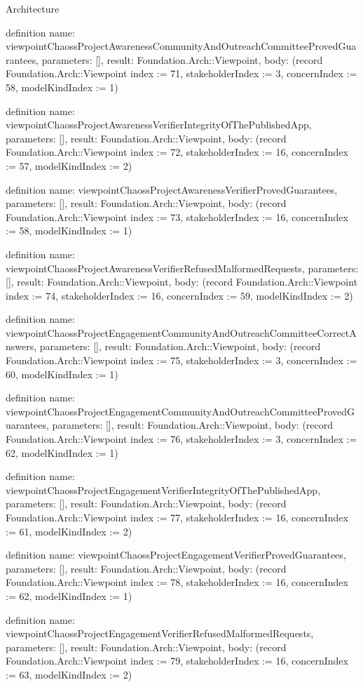\begin{lexlean}{Architecture}
\begin{semanticmodule}
definition{
  name: viewpointChaossProjectAwarenessCommunityAndOutreachCommitteeProvedGuarantees,
  parameters: [],
  result: Foundation.Arch::Viewpoint,
  body: (record Foundation.Arch::Viewpoint {index := 71, stakeholderIndex := 3, concernIndex := 58, modelKindIndex := 1})
}

definition{
  name: viewpointChaossProjectAwarenessVerifierIntegrityOfThePublishedApp,
  parameters: [],
  result: Foundation.Arch::Viewpoint,
  body: (record Foundation.Arch::Viewpoint {index := 72, stakeholderIndex := 16, concernIndex := 57, modelKindIndex := 2})
}

definition{
  name: viewpointChaossProjectAwarenessVerifierProvedGuarantees,
  parameters: [],
  result: Foundation.Arch::Viewpoint,
  body: (record Foundation.Arch::Viewpoint {index := 73, stakeholderIndex := 16, concernIndex := 58, modelKindIndex := 1})
}

definition{
  name: viewpointChaossProjectAwarenessVerifierRefusedMalformedRequests,
  parameters: [],
  result: Foundation.Arch::Viewpoint,
  body: (record Foundation.Arch::Viewpoint {index := 74, stakeholderIndex := 16, concernIndex := 59, modelKindIndex := 2})
}

definition{
  name: viewpointChaossProjectEngagementCommunityAndOutreachCommitteeCorrectAnswers,
  parameters: [],
  result: Foundation.Arch::Viewpoint,
  body: (record Foundation.Arch::Viewpoint {index := 75, stakeholderIndex := 3, concernIndex := 60, modelKindIndex := 1})
}

definition{
  name: viewpointChaossProjectEngagementCommunityAndOutreachCommitteeProvedGuarantees,
  parameters: [],
  result: Foundation.Arch::Viewpoint,
  body: (record Foundation.Arch::Viewpoint {index := 76, stakeholderIndex := 3, concernIndex := 62, modelKindIndex := 1})
}

definition{
  name: viewpointChaossProjectEngagementVerifierIntegrityOfThePublishedApp,
  parameters: [],
  result: Foundation.Arch::Viewpoint,
  body: (record Foundation.Arch::Viewpoint {index := 77, stakeholderIndex := 16, concernIndex := 61, modelKindIndex := 2})
}

definition{
  name: viewpointChaossProjectEngagementVerifierProvedGuarantees,
  parameters: [],
  result: Foundation.Arch::Viewpoint,
  body: (record Foundation.Arch::Viewpoint {index := 78, stakeholderIndex := 16, concernIndex := 62, modelKindIndex := 1})
}

definition{
  name: viewpointChaossProjectEngagementVerifierRefusedMalformedRequests,
  parameters: [],
  result: Foundation.Arch::Viewpoint,
  body: (record Foundation.Arch::Viewpoint {index := 79, stakeholderIndex := 16, concernIndex := 63, modelKindIndex := 2})
}


\end{semanticmodule}
\end{lexlean}
